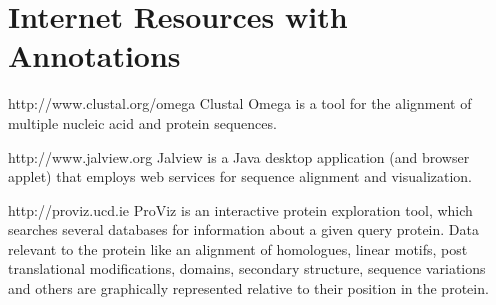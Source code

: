\documentclass[12pt]{article}
\begin{document}
\section*{Internet Resources with Annotations}%
\label{internet-resources-with-annotations}

http://www.clustal.org/omega Clustal Omega \citep{21988835} is a tool
for the alignment of multiple nucleic acid and protein sequences.

http://www.jalview.org Jalview \citep{19151095} is a Java desktop
application (and browser applet) that employs web services for sequence
alignment and visualization.

http://proviz.ucd.ie ProViz \citep{27085803} is an interactive protein
exploration tool, which searches several databases for information about
a given query protein. Data relevant to the protein like an alignment of
homologues, linear motifs, post translational modifications, domains,
secondary structure, sequence variations and others are graphically
represented relative to their position in the protein.



\end{document}
